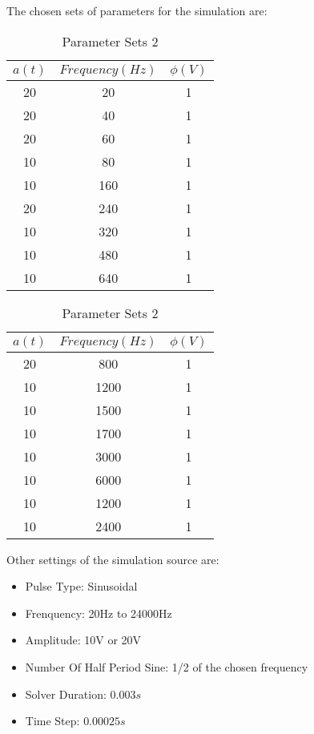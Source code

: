 \documentclass[letterpaper,12pt]{article}
\begin{document}
\noindent The chosen sets of parameters for the simulation are:
\begin{table}[H]
    \centering
    \scriptsize
    \begin{minipage}[t]{0.45\textwidth}
    \centering
    \begin{tabular}{|c|c|c|}
    \toprule
    \textbf{$a(t)$} & \textbf{$Frequency (Hz)$} & \textbf{$\phi (V)$} \\
    \midrule
    20 & 20   & 1 \\
    20 & 40   & 1 \\
    20 & 60   & 1 \\
    10 & 80   & 1 \\
    10 & 160  & 1 \\
    20 & 240  & 1 \\
    10 & 320  & 1 \\
    10 & 480  & 1 \\
    10 & 640  & 1 \\
    \bottomrule
    \end{tabular}
    \caption{Parameter Sets 1}
    \end{minipage}\hfill
    \begin{minipage}[t]{0.45\textwidth}
    \centering
    \begin{tabular}{|c|c|c|}
    \toprule
    \textbf{$a(t)$} & \textbf{$Frequency (Hz)$} & \textbf{$\phi (V)$} \\
    \midrule
    20 & 800  & 1 \\
    10 & 1200 & 1 \\
    10 & 1500 & 1 \\
    10 & 1700 & 1 \\
    10 & 3000 & 1 \\
    10 & 6000 & 1 \\
    10 & 1200 & 1 \\
    10 & 2400 & 1 \\
    \bottomrule
    \end{tabular}
    \caption{Parameter Sets 2}
    \end{minipage}
\end{table}
\noindent Other settings of the simulation source are:
\begin{multicols}{2}
\begin{itemize}
    \item Pulse Type: Sinusoidal
    \item Frenquency: 20Hz to 24000Hz
    \item Amplitude: 10V or 20V
    \item Number Of Half Period Sine: 1/2 of the chosen frequency
    \item Solver Duration: $0.003s$
    \item Time Step: $0.00025s$
\end{itemize}
\end{multicols}
\end{document}
